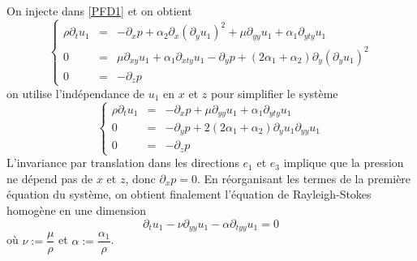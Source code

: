On injecte dans \eqref{PFD1} et on obtient
\begin{equation*}
    \left\{\begin{array}{rcl}
        \rho\partial_tu_1 & = & -\partial_xp + \alpha_2\partial_x(\partial_yu_1)^2 + \mu \partial_{yy}u_1 + \alpha_1 \partial_{yty}u_1  \\
        0 & = & \mu \partial_{xy}u_1 + \alpha_1\partial_{xty}u_1 - \partial_yp+(2\alpha_1+\alpha_2)\partial_y(\partial_yu_1)^2 \\
        0 & = & - \partial_zp
    \end{array}\right.
\end{equation*}
on utilise l'indépendance de $u_1$ en $x$ et $z$ pour simplifier le système
\begin{equation*}
    \left\{\begin{array}{rcl}
        \rho\partial_tu_1 & = & -\partial_xp + \mu \partial_{yy}u_1 + \alpha_1 \partial_{yty}u_1  \\
        0 & = & - \partial_yp+2(2\alpha_1+\alpha_2)\partial_yu_1\partial_{yy}u_1 \\
        0 & = & - \partial_zp
    \end{array}\right.
\end{equation*}
L'invariance par translation dans les directions $e_1$ et $e_3$ implique que la pression ne dépend pas de $x$ et $z$, donc $\partial_xp=0$. En réorganisant les termes de la première équation du système, on obtient finalement l'équation de Rayleigh-Stokes homogène en une dimension
\begin{equation*}
    \partial_t u_1 - \nu \partial_{yy}u_1 - \alpha \partial_{tyy}u_1=0
\end{equation*}
où $\nu := \dfrac{\mu}{\rho}$ et $\alpha := \dfrac{\alpha_1}{\rho}$.

